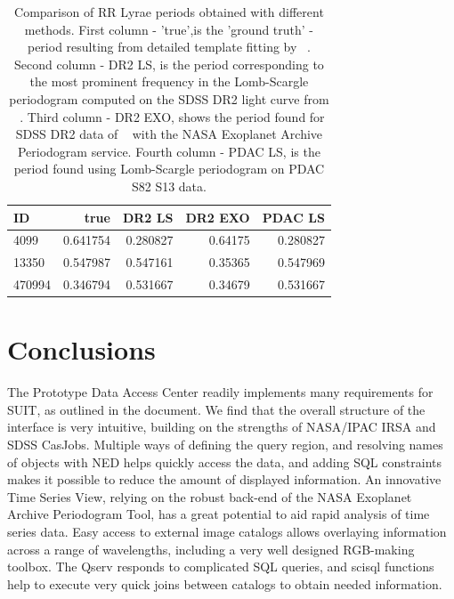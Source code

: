 \documentclass[DM,lsstdraft,toc]{lsstdoc}
\begin{document}
\begin{table}
\centering
\caption{Comparison of RR Lyrae periods obtained with different methods. First column - 'true',is the 'ground truth' -  period resulting from detailed template fitting by ~\citep{2010ApJ...708..717S}. Second column - DR2 LS, is the period corresponding to the most prominent frequency in the Lomb-Scargle periodogram  computed on the SDSS DR2 light curve from ~\citep{2010ApJ...708..717S}. Third column - DR2 EXO, shows the period found for SDSS DR2 data of  ~\citep{2010ApJ...708..717S}  with the NASA Exoplanet Archive Periodogram service.  Fourth column - PDAC LS, is the period found using Lomb-Scargle periodogram  on PDAC S82 S13 data.}
\label{tab:periods}
\begin{tabular}{ l|rrrr }
\hline
 ID      & true        & DR2 LS      & DR2 EXO      &  PDAC LS  \\
\hline
 4099    & 0.641754     & 0.280827   & 0.64175      &  0.280827 \\
 13350   & 0.547987     & 0.547161   & 0.35365      &  0.547969  \\
 470994  & 0.346794     & 0.531667   & 0.34679      &  0.531667  \\
\end{tabular}
\end{table}







\section{Conclusions}

The Prototype Data Access Center readily implements  many requirements for SUIT, as outlined in the  document. We find that the overall structure of the interface is very intuitive, building on the strengths of NASA/IPAC IRSA and SDSS CasJobs. Multiple ways of defining the query region, and resolving names of objects with NED helps quickly access the data, and adding SQL constraints makes it possible to reduce the amount of displayed information.  An innovative Time Series View,  relying on the robust back-end of the NASA Exoplanet Archive Periodogram Tool,  has a great potential to aid rapid analysis of time series data.  Easy access to external image catalogs allows overlaying information across a range of wavelengths, including a very well designed RGB-making  toolbox. The Qserv responds to complicated SQL queries, and scisql functions help to execute very quick joins between catalogs to obtain needed information.
\end{document}
